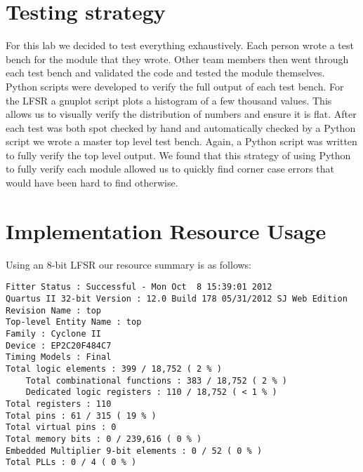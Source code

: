 \documentclass[12pt]{article}
\begin{document}
\section*{Testing strategy}
For this lab we decided to test everything exhaustively. Each person wrote a test bench for the module that they wrote. Other team members then went through each test bench and validated the code and tested the module themselves. Python scripts were developed to verify the full output of each test bench. For the LFSR a gnuplot script plots a histogram of a few thousand values. This allows us to visually verify the distribution of numbers and ensure it is flat. After each test was both spot checked by hand and automatically checked by a Python script we wrote a master top level test bench. Again, a Python script was written to fully verify the top level output. We found that this strategy of using Python to fully verify each module allowed us to quickly find corner case errors that would have been hard to find otherwise.

\newpage
\section*{Implementation Resource Usage}


Using an 8-bit LFSR our resource summary is as follows:

\begin{verbatim}
Fitter Status : Successful - Mon Oct  8 15:39:01 2012
Quartus II 32-bit Version : 12.0 Build 178 05/31/2012 SJ Web Edition
Revision Name : top
Top-level Entity Name : top
Family : Cyclone II
Device : EP2C20F484C7
Timing Models : Final
Total logic elements : 399 / 18,752 ( 2 % )
    Total combinational functions : 383 / 18,752 ( 2 % )
    Dedicated logic registers : 110 / 18,752 ( < 1 % )
Total registers : 110
Total pins : 61 / 315 ( 19 % )
Total virtual pins : 0
Total memory bits : 0 / 239,616 ( 0 % )
Embedded Multiplier 9-bit elements : 0 / 52 ( 0 % )
Total PLLs : 0 / 4 ( 0 % )
\end{verbatim}
\end{document}
